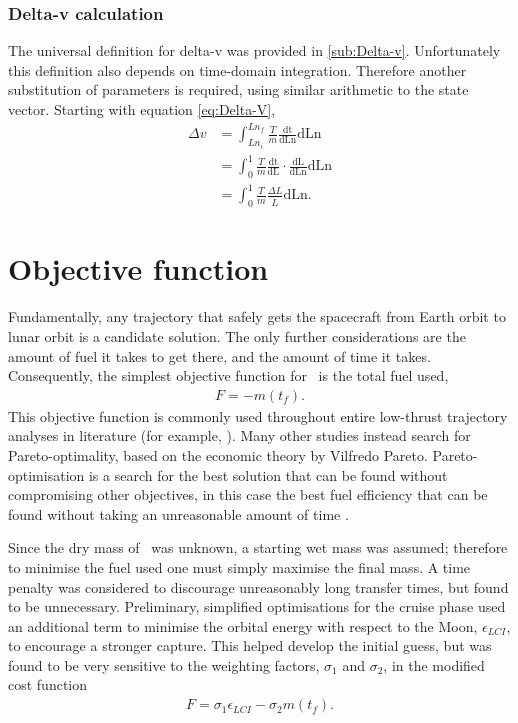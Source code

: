 \subsubsection{Delta-v calculation}
The universal definition for delta-v was provided in \autoref{sub:Delta-v}. Unfortunately this definition also depends on time-domain integration. Therefore another substitution of parameters is required, using similar arithmetic to the state vector. Starting with equation \eqref{eq:Delta-V},
\begin{subequations}
\begin{align}
\Delta v &= \int^{Ln_f}_{Ln_i}\frac{T}{m}\frac{\text{dt}}{\text{dLn}}\text{dLn}\\
&= \int^{1}_{0}\frac{T}{m}\frac{\text{dt}}{\text{dL}}\cdot\frac{\text{dL}}{\text{dLn}}\text{dLn}\\
&= \int^{1}_{0}\frac{T}{m}\frac{\Delta L}{\dot L}\text{dLn}.
\end{align}
\end{subequations}

\section{Objective function} \label{sec:Objective-function}

Fundamentally, any trajectory that safely gets the spacecraft from Earth orbit to lunar orbit is a candidate solution. The only further considerations are the amount of fuel it takes to get there, and the amount of time it takes. Consequently, the simplest objective function for \BW\ is the total fuel used, 
\begin{gather}
F = -m(t_f) \label{eq:objective}.
\end{gather}
This objective function is commonly used throughout entire low-thrust trajectory analyses in literature (for example, \cite{Ichimura2008}). Many other studies instead search for Pareto-optimality, based on the economic theory by Vilfredo Pareto. Pareto-optimisation is a search for the best solution that can be found without compromising other objectives, in this case the best fuel efficiency that can be found without taking an unreasonable amount of time \parencite{Lee2005, Coverstone2000}.  

Since the dry mass of \BW\ was unknown, a starting wet mass was assumed; therefore to minimise the fuel used one must simply maximise the final mass. A time penalty was considered to discourage unreasonably long transfer times, but found to be unnecessary. Preliminary, simplified optimisations for the cruise phase used an additional term to minimise the orbital energy with respect to the Moon, $\epsilon_{LCI}$, to encourage a stronger capture. This helped develop the initial guess, but was found to be very sensitive to the weighting factors, $\sigma_1$ and $\sigma_2$, in the modified cost function
\begin{gather}
F = \sigma_1\epsilon_{LCI}-\sigma_2m(t_f) \label{eq:objective2}.
\end{gather}
 
